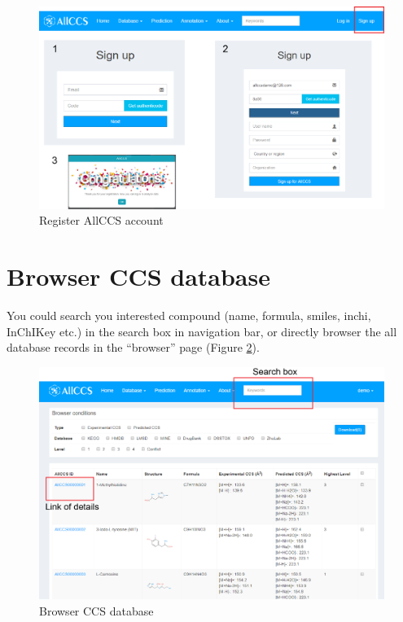 \documentclass[12pt,]{book}
\theoremstyle{definition}
\theoremstyle{definition}
\theoremstyle{definition}
\theoremstyle{remark}
\begin{document}
\begin{figure}

{\centering \includegraphics{images/chapter1/register_1} 

}

\caption{Register AllCCS account}\label{fig:FigRegister}
\end{figure}

\section{Browser CCS database}\label{chaptere1d2}

You could search you interested compound (name, formula, smiles, inchi,
InChIKey etc.) in the search box in navigation bar, or directly browser
the all database records in the ``browser'' page (Figure
\ref{fig:FigBrowser1}).

\begin{figure}

{\centering \includegraphics{images/chapter1/browser_1} 

}

\caption{Browser CCS database}\label{fig:FigBrowser1}
\end{figure}
\end{document}
